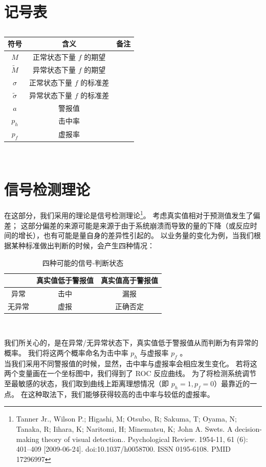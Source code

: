 \documentclass[a4paper]{article}
\begin{document}
\section*{记号表}
\begin{table}[H]
	\centering
	\caption{}
	\label{tab:sdt_symbols}
	\begin{tabular}{ccc}
		\hline
		符号 & 含义 & 备注 \\
		\hline
		$M$ & 正常状态下量 $f$ 的期望 & \\
		$\tilde{M}$ & 异常状态下量 $f$ 的期望 & \\
		$\sigma$ & 正常状态下量 $f$ 的标准差 & \\
		$\tilde{\sigma}$ & 异常状态下量 $f$ 的标准差 & \\
		$a$ & 警报值 & \\
		$p_h$ & 击中率 & \\
		$p_f$ & 虚报率 & \\
		\hline
	\end{tabular} \\
\end{table}
\section{信号检测理论}
在这部分，我们采用的理论是信号检测理论\footnote{Tanner Jr., Wilson P.; Higashi, M; Otsubo, R; Sakuma, T; Oyama, N; Tanaka, R; Iihara, K; Naritomi, H; Minematsu, K; John A. Swets. A decision-making theory of visual detection.. Psychological Review. 1954-11, 61 (6): 401–409 [2009-06-24]. doi:10.1037/h0058700. ISSN 0195-6108. PMID 17296997}。
考虑真实值相对于预测值发生了偏差；
这部分偏差的来源可能是来源于由于系统崩溃而导致的量的下降（或反应时间的增长），也有可能是量自身的差异性引起的。
以业务量的变化为例，当我们根据某种标准做出判断的时候，会产生四种情况：
\begin{table}[H]
	\centering
	\caption{四种可能的信号-判断状态}
	\label{tab:sdt-four}
	\begin{tabular}{|c|c|c|}
		\hline
		 & 真实值低于警报值 & 真实值高于警报值 \\
		\hline
		异常 & 击中 & 漏报 \\
		\hline
		无异常 & 虚报 & 正确否定 \\
		\hline
	\end{tabular} \\
\end{table}
我们所关心的，是在异常/无异常状态下，真实值低于警报值从而判断为有异常的概率。
我们将这两个概率命名为击中率 $p_h$ 与虚报率 $p_f$ 。
\\
\indent 当我们采用不同警报值的时候，显然，击中率与虚报率会相应发生变化。
若将这两个变量画在一个坐标图中，我们得到了 ROC 反应曲线。
为了将检测系统调节至最敏感的状态，我们取到曲线上距离理想情况（即 $p_h = 1, p_f = 0$）最靠近的一点。
在这种取法下，我们能够获得较高的击中率与较低的虚报率。
\end{document}
